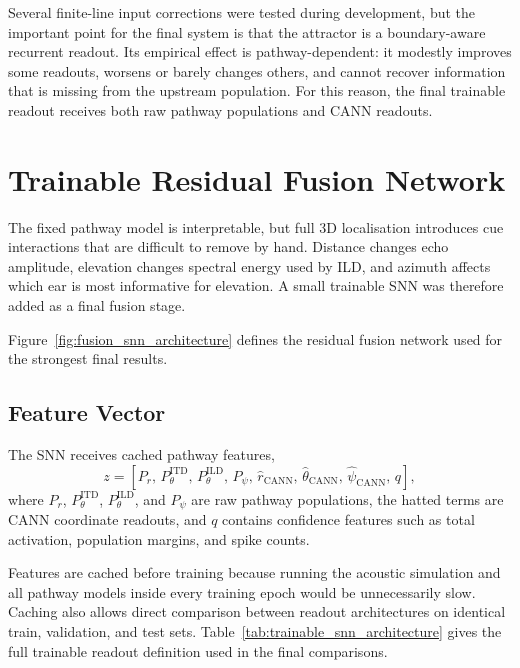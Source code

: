 Several finite-line input corrections were tested during development, but the important point for the final system is that the attractor is a boundary-aware recurrent readout. Its empirical effect is pathway-dependent: it modestly improves some readouts, worsens or barely changes others, and cannot recover information that is missing from the upstream population. For this reason, the final trainable readout receives both raw pathway populations and CANN readouts.

\section{Trainable Residual Fusion Network}

The fixed pathway model is interpretable, but full 3D localisation introduces cue interactions that are difficult to remove by hand. Distance changes echo amplitude, elevation changes spectral energy used by ILD, and azimuth affects which ear is most informative for elevation. A small trainable SNN was therefore added as a final fusion stage.



Figure~\ref{fig:fusion_snn_architecture} defines the residual fusion network used for the strongest final results.

\subsection{Feature Vector}

The SNN receives cached pathway features,
\begin{equation}
    z =
    \left[
    P_r,\,
    P^{\mathrm{ITD}}_{\theta},\,
    P^{\mathrm{ILD}}_{\theta},\,
    P_{\psi},\,
    \hat{r}_{\mathrm{CANN}},\,
    \hat{\theta}_{\mathrm{CANN}},\,
    \hat{\psi}_{\mathrm{CANN}},\,
    q
    \right],
\end{equation}
where $P_r$, $P^{\mathrm{ITD}}_{\theta}$, $P^{\mathrm{ILD}}_{\theta}$, and $P_{\psi}$ are raw pathway populations, the hatted terms are CANN coordinate readouts, and $q$ contains confidence features such as total activation, population margins, and spike counts.

Features are cached before training because running the acoustic simulation and all pathway models inside every training epoch would be unnecessarily slow. Caching also allows direct comparison between readout architectures on identical train, validation, and test sets. Table~\ref{tab:trainable_snn_architecture} gives the full trainable readout definition used in the final comparisons.

